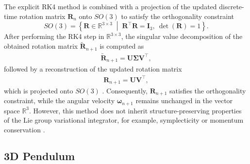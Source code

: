 The explicit RK4 method is combined with a projection of the updated discrete-time rotation matrix $\bm{R}_n$ onto $SO(3)$ to satisfy the orthogonality constraint
\[
SO(3)
=
\left\{
\bm{R}\in\mathbb{R}^{3\times 3}
\;\middle|\;
\bm{R}^\top \bm{R}=\bm{I}_3,\ 
\det(\bm{R})=1
\right\}.\]
After performing the RK4 step in $\mathbb{R}^{3 \times 3}$, the singular value decomposition of the obtained rotation matrix \(\widetilde{\bm{R}}_{n+1}\) is computed as
\begin{align}
    \widetilde{\bm{R}}_{n+1}=\bm{U}\bm{\Sigma}\bm{V}^{\top},
\end{align}
followed by a reconstruction of the updated rotation matrix
\begin{align}
    \bm{R}_{n+1}=\bm{U}\bm{V}^{\top},
\end{align}
which is projected onto $SO(3)$ \cite{YanaiTakeuchiTakane2011SVD}. Consequently, $\bm{R}_{n+1}$ satisfies the orthogonality constraint, while the angular velocity $\bm{\omega}_{n+1}$ remains unchanged in the vector space $\mathbb{R}^{3}$. However, this method does not inherit structure-preserving properties of the Lie group variational integrator, for example, symplecticity or momentum conservation \cite{CELLEDONI2003421}. 

\subsection{3D Pendulum}
\label{subsec:3d_pendulum_numercial_simulation}

